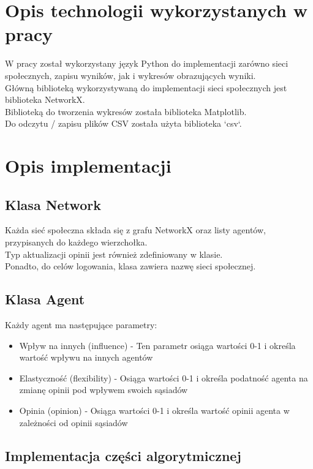 \documentclass{wfiisul}
\begin{document}
\chapter{Opis technologii wykorzystanych w pracy}

W pracy został wykorzystany język Python do implementacji zarówno sieci społecznych, zapisu wyników, jak i wykresów obrazujących wyniki. \\
Główną biblioteką wykorzystywaną do implementacji sieci społecznych jest biblioteka NetworkX. \\
Biblioteką do tworzenia wykresów została biblioteka Matplotlib. \\
Do odczytu / zapisu plików CSV została użyta biblioteka `csv`. \\

\chapter{Opis implementacji}

\section{Klasa Network}

Każda sieć społeczna składa się z grafu NetworkX oraz listy agentów, przypisanych do każdego wierzchołka. \\
Typ aktualizacji opinii jest również zdefiniowany w klasie. \\
Ponadto, do celów logowania, klasa zawiera nazwę sieci społecznej. \\

\section{Klasa Agent}

Każdy agent ma następujące parametry:
\begin{itemize}
  \item Wpływ na innych (influence) - Ten parametr osiąga wartości 0-1 i określa wartość wpływu na innych agentów
  \item Elastyczność (flexibility) - Osiąga wartości 0-1 i określa podatność agenta na zmianę opinii pod wpływem swoich sąsiadów
  \item Opinia (opinion) - Osiąga wartości 0-1 i określa wartość opinii agenta w zależności od opinii sąsiadów
\end{itemize}

\section{Implementacja części algorytmicznej}
\end{document}
